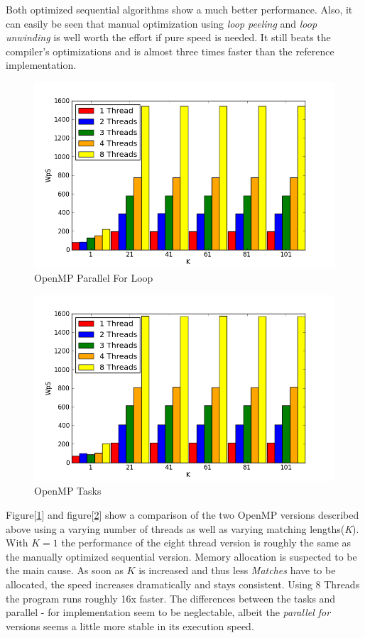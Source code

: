 \documentclass[a4paper,twoside,11pt]{article}
\begin{document}
Both optimized sequential algorithms show a much better performance. Also, it can easily be seen that manual optimization using \textit{loop peeling} and \textit{loop unwinding} is well worth the effort if pure speed is needed. It still beats the compiler's optimizations and is almost three times faster than the reference implementation.

\begin{figure}[hbtp]
\caption{OpenMP Parallel For Loop}
\centering
\label{fig:omp_parallel}
\includegraphics[scale=0.8]{omp_for.png}
\end{figure}

\begin{figure}[hbtp]
\caption{OpenMP Tasks}
\centering
\label{fig:omp_tasks}
\includegraphics[scale=0.8]{omp_tasks.png}
\end{figure}

Figure[\ref{fig:omp_parallel}] and figure[\ref{fig:omp_tasks}] show a comparison of the two OpenMP versions described above using a  varying number of threads as well as varying matching lengths(\textit{K}). With $K=1$ the performance of the eight thread version is roughly the same as the manually optimized sequential version. Memory allocation is suspected to be the main cause. As soon as $K$ is increased and thus less \textit{Matches} have to be allocated, the speed increases dramatically and stays consistent.
Using 8 Threads the program runs roughly 16x faster.
The differences between the tasks and parallel - for implementation seem to be neglectable, albeit the \textit{parallel for} versions seems a little more stable in its execution speed.
\end{document}
